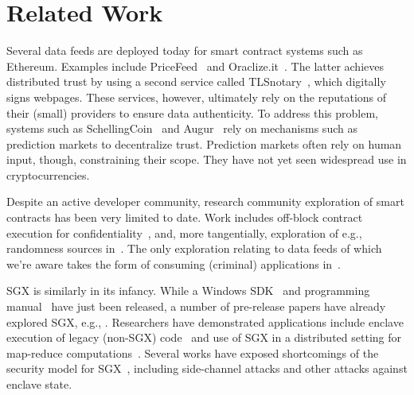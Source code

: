 \section{Related Work}
\label{sec:related}

Several data feeds are deployed today for smart contract systems such as Ethereum. Examples include PriceFeed~\cite{PriceFeed:2016} and Oraclize.it~\cite{Oraclize:2016}. The latter achieves distributed trust by using a second service called TLSnotary~\cite{TLSnotary}, which digitally signs webpages. These services, however, ultimately rely on the reputations of their (small) providers to ensure data authenticity.  To address this problem, systems such as SchellingCoin~\cite{schellingcoin} and Augur~\cite{augur} rely on mechanisms such as prediction markets to decentralize trust. Prediction markets often rely on human input, though, constraining their scope. They have not yet seen widespread use in cryptocurrencies. 

Despite an active developer community, research community exploration of smart contracts has been very limited to date. Work includes off-block contract execution for confidentiality~\cite{hawk}, and, more tangentially, exploration of e.g., randomness sources in~\cite{bonneau2015bitcoin}. The only exploration relating to data feeds of which we're aware takes the form of consuming (criminal) applications in~\cite{gyges}.

SGX is similarly in its infancy.
While a Windows SDK~\cite{sgxsdk} and programming manual~\cite{sgxmanual} have just been released, a number of pre-release papers have already explored SGX, e.g., \cite{Baumann:2015:SAU:2818727.2799647,7163017,7163052,anati2013innovative,McKeen:2013jv,Phegade:2013km}. Researchers have demonstrated applications include enclave execution of legacy (non-SGX) code~\cite{Haven} and use of SGX in a distributed setting for map-reduce computations~\cite{VC3}. Several works have exposed shortcomings of the security model for SGX~\cite{sgxexplained,sgxsok,shihardwaretalk}, including side-channel attacks and other attacks against enclave state. 


